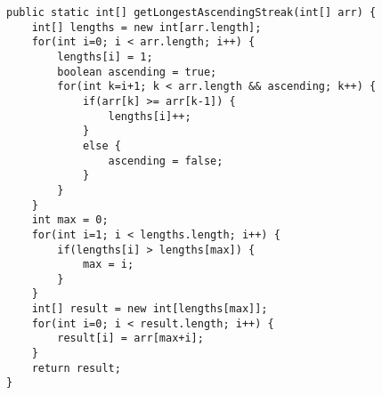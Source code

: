 \begin{questions}
\begin{lstlisting}[basicstyle=\small]
public static int[] getLongestAscendingStreak(int[] arr) {
	int[] lengths = new int[arr.length];
	for(int i=0; i < arr.length; i++) {
		lengths[i] = 1;
		boolean ascending = true;
		for(int k=i+1; k < arr.length && ascending; k++) {
			if(arr[k] >= arr[k-1]) {
				lengths[i]++;
			}
			else {
				ascending = false;
			}
		}
	}
	int max = 0;
	for(int i=1; i < lengths.length; i++) {
		if(lengths[i] > lengths[max]) {
			max = i;
		}
	}
	int[] result = new int[lengths[max]];
	for(int i=0; i < result.length; i++) {
		result[i] = arr[max+i];
	}
	return result;
}
\end{lstlisting}

\else
\fi

\end{questions}	

